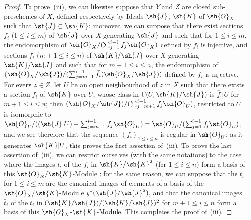 \begin{proof}
To prove~(iii), we can likewise suppose that $Y$ and $Z$ are closed sub-preschemes of $X$, defined respectively by Ideals $\sh{J}$, $\sh{K}$ of $\sh{O}_X$ such that $\sh{J}\subset\sh{K}$; moreover, we can suppose that there exist sections $f_i$ ($1\leq i\leq m$) of $\sh{J}$ over $X$ generating $\sh{J}$ and such that for $1\leq i\leq m$, the endomorphism of $\sh{O}_X/(\sum_{j=1}^{i-1}f_j\sh{O}_X)$ defined by $f_i$ is injective, and sections $\bar{f}_i$ ($m+1\leq i\leq n$) of $\sh{K}/\sh{J}$ over $X$ generating $\sh{K}/\sh{J}$ and such that for $m+1\leq i\leq n$, the endomorphism of $(\sh{O}_X/\sh{J})/(\sum_{j=m+1}^{i-1}\bar{f}_i(\sh{O}_X/\sh{J}))$ defined by $\bar{f}_i$ is injective.
For every $z\in Z$, let $U$ be an open neighbourhood of $z$ in $X$ such that there exists a section $f_i$ of $\sh{K}$ over $U$, whose class in $\Gamma(U,\sh{K}/\sh{J})$ is $\bar{f}_i|U$ for $m+1\leq i\leq n$; then $(\sh{O}_X/\sh{J})/(\sum_{j=m+1}^{i-1}\bar{f}_j\sh{O}_U)$, restricted to $U$ is isomorphic to $\sh{O}_U/((\sh{J}|U)+\sum_{j=m+1}^{i-1}f_j\sh{O}_U)=\sh{O}_U/(\sum_{j=1}^{i-1}f_j\sh{O}_U)$, and we see therefore that the sequence $(f_i)_{1\leq i\leq n}$ is regular in $\sh{O}_U$; as it generates $\sh{K}|U$, this proves the first assertion of~(iii).
To prove the last assertion of~(iii), we can restrict ourselves (with the same notations) to the case where the images $t_i$ of the $f_i$ in $\sh{K}/\sh{K}^2$ (for $1\leq i\leq n$) form a basis of this $\sh{O}_X/\sh{K}$-Module ; for the same reason, we can suppose that the $t_i$ for $1\leq i\leq m$ are the canonical images of elements of a basis of the $\sh{O}_X/\sh{K}$-Module $g^*(\sh{J}/\sh{J}^2)$, and that the canonical images $\bar{t}_i$ of the $t_i$ in $(\sh{K}/\sh{J})/(\sh{K}/\sh{J})^2$ for $m+1\leq i\leq n$ form a basis of this $\sh{O}_X$-$\sh{K}$-Module.
This completes the proof of~(iii).


\end{proof}
